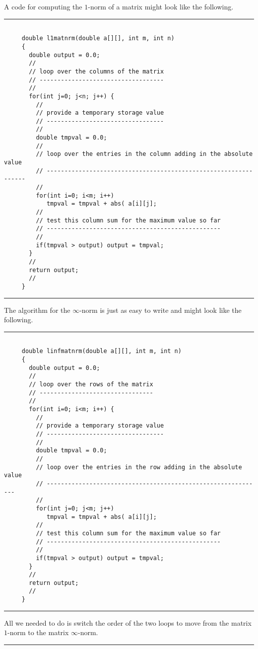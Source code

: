 \documentclass[10pt,fleqn]{article}
\begin{document}
A code for computing the $1$-norm of a matrix might look like the following.
\vskip0.1in\hrule\vskip0.1in
\begin{verbatim}

     double l1matnrm(double a[][], int m, int n)
     {
       double output = 0.0;
       //
       // loop over the columns of the matrix
       // -----------------------------------
       //
       for(int j=0; j<n; j++) {
         //
         // provide a temporary storage value
         // ---------------------------------
         //
         double tmpval = 0.0;
         //
         // loop over the entries in the column adding in the absolute value
         // ----------------------------------------------------------------
         //
         for(int i=0; i<m; i++)
            tmpval = tmpval + abs( a[i][j];
         //
         // test this column sum for the maximum value so far
         // -------------------------------------------------
         //
         if(tmpval > output) output = tmpval;
       }
       //
       return output;
       //
     }

\end{verbatim}
\vskip0.1in\hrule\vskip0.1in
The algorithm for the $\infty$-norm is just as easy to write and might look like
the following.
\vskip0.1in\hrule\vskip0.1in
\begin{verbatim}

     double linfmatnrm(double a[][], int m, int n)
     {
       double output = 0.0;
       //
       // loop over the rows of the matrix
       // --------------------------------
       //
       for(int i=0; i<m; i++) {
         //
         // provide a temporary storage value
         // ---------------------------------
         //
         double tmpval = 0.0;
         //
         // loop over the entries in the row adding in the absolute value
         // -------------------------------------------------------------
         //
         for(int j=0; j<m; j++)
            tmpval = tmpval + abs( a[i][j];
         //
         // test this column sum for the maximum value so far
         // -------------------------------------------------
         //
         if(tmpval > output) output = tmpval;
       }
       //
       return output;
       //
     }

\end{verbatim}
\vskip0.1in\hrule\vskip0.1in
All we needed to do is switch the order of the two loops to move from the
matrix $1$-norm to the matrix $\infty$-norm.
\vskip0.1in\hrule\vskip0.1in
\newpage
\end{document}
